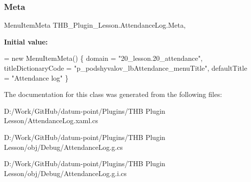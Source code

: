 \subsubsection{\texorpdfstring{Meta}{Meta}}
{\footnotesize\ttfamily Menu\+Item\+Meta T\+H\+B\+\_\+\+Plugin\+\_\+\+Lesson.\+Attendance\+Log.\+Meta\hspace{0.3cm}{\ttfamily [get]}, {\ttfamily [set]}}

{\bfseries Initial value\+:}
\begin{DoxyCode}
= \textcolor{keyword}{new} MenuItemMeta()
        \{
            domain = \textcolor{stringliteral}{"20\_lesson.20\_attendance"},
            titleDictionaryCode = \textcolor{stringliteral}{"p\_podshyvalov\_lbAttendance\_menuTitle"},
            defaultTitle = \textcolor{stringliteral}{"Attendance log"}
        \}
\end{DoxyCode}


The documentation for this class was generated from the following files\+:\begin{DoxyCompactItemize}
\item 
D\+:/\+Work/\+Git\+Hub/datum-\/point/\+Plugins/\+T\+H\+B Plugin Lesson/Attendance\+Log.\+xaml.\+cs\item 
D\+:/\+Work/\+Git\+Hub/datum-\/point/\+Plugins/\+T\+H\+B Plugin Lesson/obj/\+Debug/Attendance\+Log.\+g.\+cs\item 
D\+:/\+Work/\+Git\+Hub/datum-\/point/\+Plugins/\+T\+H\+B Plugin Lesson/obj/\+Debug/Attendance\+Log.\+g.\+i.\+cs\end{DoxyCompactItemize}

